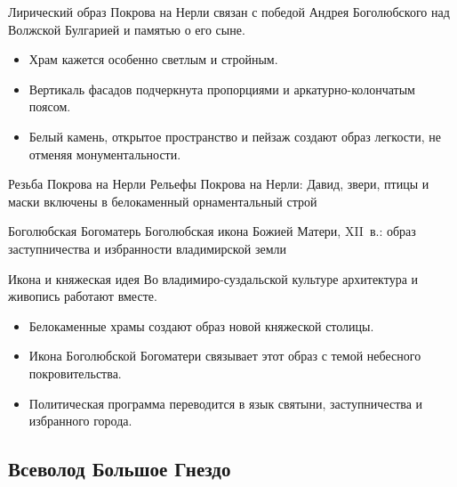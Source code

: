 \begin{frame}{Лирический образ}
  Покрова на Нерли связан с победой Андрея Боголюбского
  над Волжской Булгарией и памятью о его сыне.

  \begin{itemize}
    \item Храм кажется особенно светлым и стройным.
    \item Вертикаль фасадов подчеркнута пропорциями
          и аркатурно-колончатым поясом.
    \item Белый камень, открытое пространство и пейзаж
          создают образ легкости, не отменяя монументальности.
  \end{itemize}
\end{frame}

\begin{frame}{Резьба Покрова на Нерли}
    {Рельефы Покрова на Нерли:
     Давид, звери, птицы и маски включены
     в белокаменный орнаментальный строй}
\end{frame}

\begin{frame}{Боголюбская Богоматерь}
    {Боголюбская икона Божией Матери, XII~в.:
     образ заступничества и избранности владимирской земли}
\end{frame}

\begin{frame}{Икона и княжеская идея}
  Во владимиро-суздальской культуре архитектура и живопись
  работают вместе.

  \begin{itemize}
    \item Белокаменные храмы создают образ новой княжеской столицы.
    \item Икона Боголюбской Богоматери связывает этот образ
          с темой небесного покровительства.
    \item Политическая программа переводится в язык святыни,
          заступничества и избранного города.
  \end{itemize}
\end{frame}

\subsection{Всеволод Большое Гнездо}

